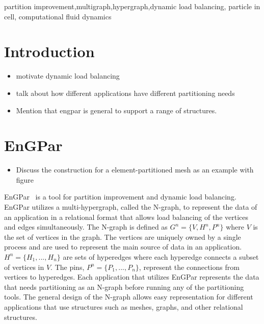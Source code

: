 \documentclass[conference]{IEEEtran}
\begin{document}
\begin{IEEEkeywords}
partition improvement,multigraph,hypergraph,dynamic load balancing,
particle in cell, computational fluid dynamics
\end{IEEEkeywords}

\section{Introduction}

\begin{itemize}
\item motivate dynamic load balancing
\item talk about how different applications have different partitioning needs
\item Mention that engpar is general to support a range of structures.
\end{itemize}

\section{EnGPar}

\begin{itemize}
\item Discuss the construction for a element-partitioned mesh as an example with figure
\end{itemize}

EnGPar~\cite{engparSC17,engpar_github} is a tool for partition improvement and
dynamic load balancing.
EnGPar utilizes a multi-hypergraph, called the N-graph, to represent the data of
an application in a relational format that allows load balancing of the vertices
and edges simultaneously.
The N-graph is defined as $G^n = \{V, H^n, P^n\}$ where
$V$ is the set of vertices in the graph. The vertices are uniquely owned by a single
process and are used to represent the main source of data in an application.
$H^n = \{H_1, ..., H_n\}$ are sets of hyperedges where each hyperedge connects a
subset of vertices in $V$. The pins, $P^n = \{P_1,...,P_n\}$, represent the connections from
vertices to hyperedges. Each application that utilizes EnGPar represents the data
that needs partitioning as an N-graph before running any of the partitioning tools.
The general design of the N-graph allows easy representation for different applications
that use structures such as meshes, graphs, and other relational structures.
\end{document}

